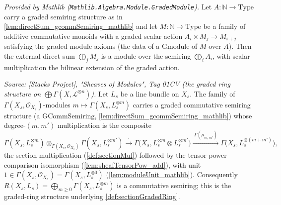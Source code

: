 \begin{lemma}
  \label{lem:directSum_gmodule_mathlib}
  \mathlibok
  \textit{Provided by Mathlib (\texttt{Mathlib.Algebra.Module.GradedModule}).}
  Let \(A : \mathbb{N} \to \mathrm{Type}\) carry a graded semiring structure as
  in \cref{lem:directSum_gcommSemiring_mathlib} and let
  \(M : \mathbb{N} \to \mathrm{Type}\) be a family of additive commutative
  monoids with a graded scalar action \(A_i \times M_j \to M_{i+j}\) satisfying
  the graded module axioms (the data of a \(\mathrm{Gmodule}\) of \(M\) over
  \(A\)). Then the external direct sum \(\bigoplus_j M_j\) is a module over the
  semiring \(\bigoplus_i A_i\), with scalar multiplication the bilinear
  extension of the graded action.
\end{lemma}

\begin{lemma}
  \label{lem:sectionGradedRing_gcommSemiring}
  \textit{Source: [Stacks Project], "Sheaves of Modules", Tag 01CV (the graded
  ring structure on \(\bigoplus \Gamma(X,\mathcal{L}^{\otimes n})\)).}
  Let \(L_s\) be a line bundle on \(X_s\). The family of
  \(\Gamma(X_s,\mathcal{O}_{X_s})\)-modules
  \(m \mapsto \Gamma(X_s, L_s^{\otimes m})\) carries a graded commutative
  semiring structure (a \(\mathrm{GCommSemiring}\),
  \cref{lem:directSum_gcommSemiring_mathlib}) whose degree-\((m,m')\)
  multiplication is the composite
  \[
    \Gamma(X_s, L_s^{\otimes m}) \otimes_{\Gamma(X_s,\mathcal{O}_{X_s})}
      \Gamma(X_s, L_s^{\otimes m'})
    \xrightarrow{\ \cdot\ }
    \Gamma\bigl(X_s, L_s^{\otimes m} \otimes L_s^{\otimes m'}\bigr)
    \xrightarrow{\ \Gamma(\mu_{m,m'})\ }
    \Gamma\bigl(X_s, L_s^{\otimes (m+m')}\bigr),
  \]
  the section multiplication (\cref{def:sectionMul}) followed by the
  tensor-power comparison isomorphism (\cref{lem:sheafTensorPow_add}), with unit
  \(1 \in \Gamma(X_s, \mathcal{O}_{X_s}) = \Gamma(X_s, L_s^{\otimes 0})\)
  (\cref{lem:moduleUnit_mathlib}). Consequently
  \(R(X_s, L_s) = \bigoplus_{m \ge 0} \Gamma(X_s, L_s^{\otimes m})\) is a
  commutative semiring; this is the graded-ring structure underlying
  \cref{def:sectionGradedRing}.
\end{lemma}


